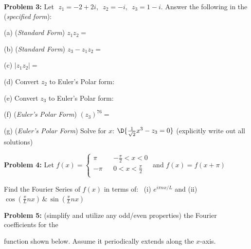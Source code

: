 \documentclass[12pt]{amsart}
\numberwithin{equation}{section}
\begin{document}
{\bf Problem 3:} Let \,\,$z_1 = -2+2i$,\,\, $z_2 = -i$,\,\, $z_3 = 1-i$. \quad Answer the following in the ({\em specified form}):

\vspace{0.2cm}

(a) ({\em Standard Form}) $z_1z_2 = $

\vspace{1.8cm}

(b) ({\em Standard Form}) $z_3-z_1z_2 = $

\vspace{1.8cm}

(c) $|z_1z_2| = $

\vspace{2.8cm}

(d) Convert $z_2$ to Euler's Polar form:

\vspace{2.8cm}

(e) Convert $z_3$ to Euler's Polar form:

\vspace{2.8cm}

(f) ({\em Euler's Polar Form})  $(z_3)^{76} = $

\vspace{2.8cm}

(g) ({\em Euler's Polar Form}) Solve for $x$: \quad $\D{\frac{1}{\sqrt{2}}x^3 - z_3 = 0}$ \quad (explicitly write out all solutions)

\thispagestyle{empty}
\newpage
\thispagestyle{empty}

{\bf Problem 4:} Let \quad
$
f(x) = 
\left\{
\begin{array}{lrc}
	 \pi & & -\frac{\pi}{2} < x < 0\\
	-\pi & & 0  < x < \frac{\pi}{2}\\
\end{array}
\right.
$  \quad and \quad $f(x) = f(x+\pi)$

\vspace{0.1cm}

Find the Fourier Series of $f(x)$ in terms of: \,  (i) $e^{i\pi n x/L}$ and (ii) $\cos\left(\frac{\pi}{L}nx\right) \, \& \, \sin\left(\frac{\pi}{L}nx\right)$

\thispagestyle{empty}
\newpage
\thispagestyle{empty}

{\bf Problem 5:}  (simplify and utilize any odd/even properties) the Fourier coefficients for the 

function shown below.  Assume it periodically extends along the $x$-axis.
\end{document}
